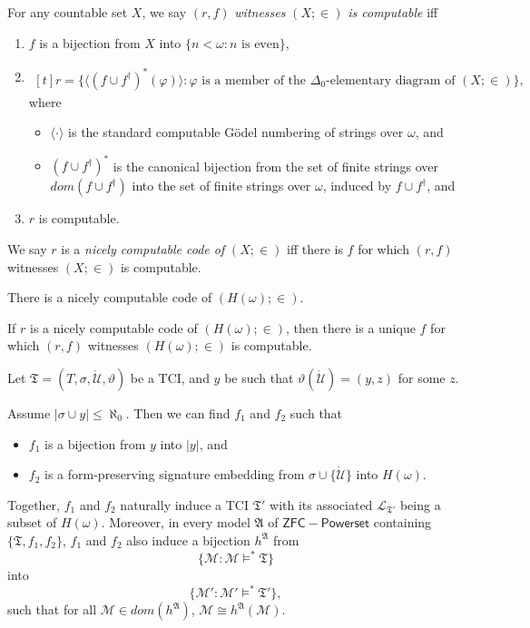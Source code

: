 \documentclass[12pt]{article}
\numberwithin{equation}{section}
\begin{document}
\begin{defi}
For any countable set $X$, we say $(r, f)$ \emph{witnesses} $(X; \in)$ \emph{is computable} iff
\begin{enumerate}[label=(\alph*)] 
    \item $f$ is a bijection from $X$ into $\{n < \omega : n \text{ is even}\}$,
    \item
    \!
    $\begin{aligned}[t]
        r = \{\langle (f \cup f^{\dagger})^*(\varphi) \rangle : \varphi \text{ is a member of the } \Delta_0 \text{-elementary diagram of } (X; \in)\}, 
    \end{aligned}$
    \medskip
    \\
    where 
    \begin{itemize}
        \item $\langle \cdot \rangle$ is the standard computable G\"odel numbering of strings over $\omega$, and
        \item $(f \cup f^{\dagger})^*$ is the canonical bijection from the set of finite strings over $dom(f \cup f^{\dagger})$ into the set of finite strings over $\omega$, induced by $f \cup f^{\dagger}$, and
    \end{itemize}
    \item $r$ is computable.
\end{enumerate}
We say $r$ is a \emph{nicely computable code of} $(X; \in)$ iff there is $f$ for which $(r, f)$ witnesses $(X; \in)$ is computable.
\end{defi}

\begin{fact}
There is a nicely computable code of $(H(\omega); \in)$. 
\end{fact}

\begin{fact}\label{uniquecode}
If $r$ is a nicely computable code of $(H(\omega); \in)$, then there is a unique $f$ for which $(r, f)$ witnesses $(H(\omega); \in)$ is computable.
\end{fact}

Let $\mathfrak{T} = (T, \sigma, \dot{\mathcal{U}}, \vartheta)$ be a TCI, and $y$ be such that $\vartheta(\dot{\mathcal{U}}) = (y, z)$ for some $z$.

Assume $|\sigma \cup y| \leq \aleph_0$. Then we can find $f_1$ and $f_2$ such that
\begin{itemize}
    \item $f_1$ is a bijection from $y$ into $|y|$, and
    \item $f_2$ is a form-preserving signature embedding from $\sigma \cup \{\dot{\mathcal{U}}\}$ into $H(\omega)$.
\end{itemize}
Together, $f_1$ and $f_2$ naturally induce a TCI $\mathfrak{T}'$ with its associated $\mathcal{L}_{\mathfrak{T}'}$ being a subset of $H(\omega)$. Moreover, in every model $\mathfrak{A}$ of $\mathsf{ZFC - Powerset}$ containing $\{\mathfrak{T}, f_1, f_2\}$, $f_1$ and $f_2$ also induce a bijection $h^{\mathfrak{A}}$ from $$\{\mathcal{M} : \mathcal{M} \models^* \mathfrak{T}\}$$ into $$\{\mathcal{M}' : \mathcal{M}' \models^* \mathfrak{T}'\},$$ such that for all $\mathcal{M} \in dom(h^{\mathfrak{A}})$, $\mathcal{M} \cong h^{\mathfrak{A}}(\mathcal{M})$. 
\end{document}
